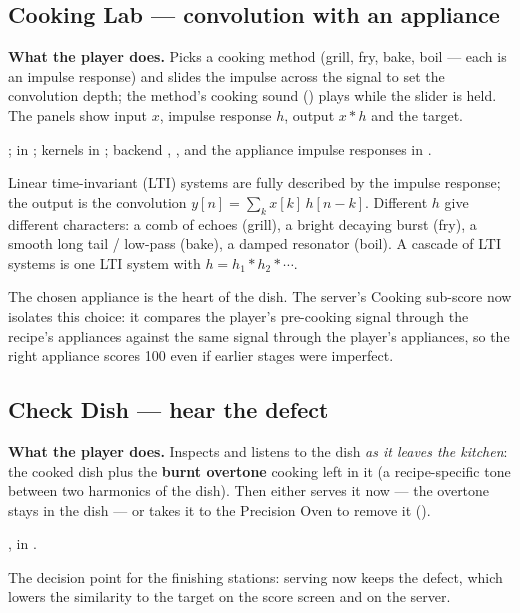 \documentclass[11pt,a4paper]{article}
\begin{document}
\subsection{Cooking Lab --- convolution with an appliance}
\textbf{What the player does.} Picks a cooking method (grill, fry, bake, boil ---
each is an impulse response) and slides the impulse across the signal to set the
convolution depth; the method's cooking sound () plays while the
slider is held. The panels show input $x$, impulse response $h$, output $x*h$
and the target.

\begin{filesbox}
;  in
; kernels in ;
backend , ,  and the appliance impulse
responses in .
\end{filesbox}
\begin{conceptbox}
Linear time-invariant (LTI) systems are fully described by the impulse response;
the output is the convolution $y[n]=\sum_k x[k]\,h[n-k]$. Different $h$ give
different characters: a comb of echoes (grill), a bright decaying burst (fry), a
smooth long tail / low-pass (bake), a damped resonator (boil). A cascade of LTI
systems is one LTI system with $h=h_1*h_2*\cdots$.
\end{conceptbox}
\begin{impactbox}
The chosen appliance is the heart of the dish. The server's Cooking sub-score now
isolates this choice: it compares the player's pre-cooking signal through the
recipe's appliances against the same signal through the player's appliances, so the
right appliance scores 100 even if earlier stages were imperfect.
\end{impactbox}

\subsection{Check Dish --- hear the defect}
\textbf{What the player does.} Inspects and listens to the dish \emph{as it leaves the
kitchen}: the cooked dish plus the \textbf{burnt overtone} cooking left in it (a
recipe-specific tone between two harmonics of the dish). Then either serves it now ---
the overtone stays in the dish --- or takes it to the Precision Oven to remove it
().
\begin{filesbox},  in .\end{filesbox}
\begin{impactbox}
The decision point for the finishing stations: serving now keeps the defect, which lowers
the similarity to the target on the score screen and on the server.
\end{impactbox}
\end{document}
